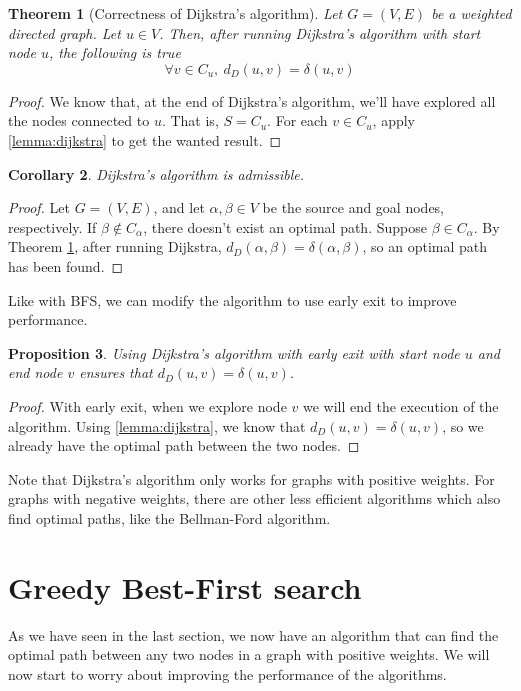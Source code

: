 \documentclass[12pt]{report}
\newtheorem{theorem}{Theorem}[chapter]
\newtheorem{proposition}[theorem]{Proposition}
\newtheorem{corollary}[theorem]{Corollary}
\begin{document}
\begin{theorem}[Correctness of Dijkstra's algorithm]
\label{thm:dijkstra}
Let $G = (V, E)$ be a weighted directed graph. Let $u \in V$. Then, after running Dijkstra's algorithm with start node $u$, the following is true
\[ \forall v \in C_u,\  d_D(u, v) = \delta(u, v) \]
\end{theorem}
\begin{proof}
We know that, at the end of Dijkstra's algorithm, we'll have explored all the nodes connected to $u$. That is, $S = C_u$. For each $v \in C_u$, apply \ref{lemma:dijkstra} to get the wanted result.
\end{proof}

\begin{corollary}
Dijkstra's algorithm is admissible.
\end{corollary}
\begin{proof}
Let $G = (V, E)$, and let $\alpha, \beta \in V$ be the source and goal nodes, respectively. If $\beta \not \in C_\alpha$, there doesn't exist an optimal path. Suppose $\beta \in C_\alpha$. By Theorem \ref{thm:dijkstra}, after running Dijkstra, $d_D(\alpha, \beta) = \delta(\alpha, \beta)$, so an optimal path has been found.
\end{proof}

Like with BFS, we can modify the algorithm to use early exit to improve performance.
\begin{proposition}
Using Dijkstra's algorithm with early exit with start node $u$ and end node $v$ ensures that $d_D(u, v) = \delta(u, v)$.
\end{proposition}
\begin{proof}
With early exit, when we explore node $v$ we will end the execution of the algorithm. Using \ref{lemma:dijkstra}, we know that $d_D(u, v) = \delta(u, v)$, so we already have the optimal path between the two nodes.
\end{proof}

Note that Dijkstra's algorithm only works for graphs with positive weights. For graphs with negative weights, there are other less efficient algorithms which also find optimal paths, like the Bellman-Ford algorithm.

\section{Greedy Best-First search}
\label{section:greedy}
As we have seen in the last section, we now have an algorithm that can find the optimal path between any two nodes in a graph with positive weights. We will now start to worry about improving the performance of the algorithms.
\end{document}
